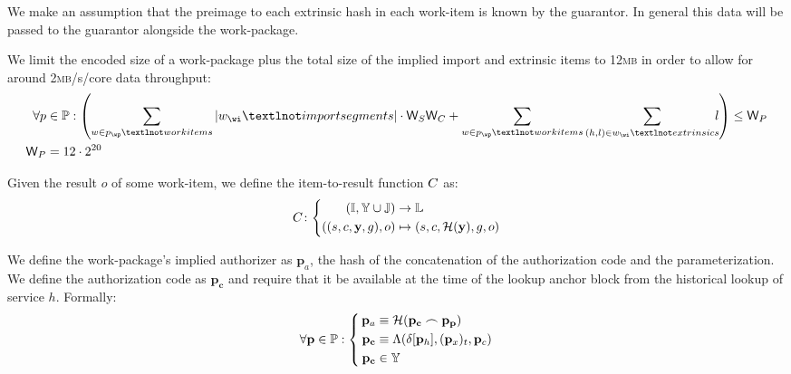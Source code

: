 We make an assumption that the preimage to each extrinsic hash in each work-item is known by the guarantor. In general this data will be passed to the guarantor alongside the work-package.

We limit the encoded size of a work-package plus the total size of the implied import and extrinsic items to 12\textsc{mb} in order to allow for around 2\textsc{mb}/s/core data throughput:
\begin{align}
  \label{eq:checkextractsize}
  \forall p &\in \mathbb{P}: \left(
  \sum_{w \in p_\wp¬workitems} |w_\wi¬importsegments|\cdot\mathsf{W}_S\mathsf{W}_C + \sum_{w \in p_\wp¬workitems} \sum_{(h, l) \in w_\wi¬extrinsics} \!\!\!l\right) \le \mathsf{W}_P \\
  \mathsf{W}_P &= 12\cdot2^{20}
\end{align}


Given the result $o$ of some work-item, we define the item-to-result function $C$ as:
\begin{equation}
  \itemtoresult\colon\left\{\begin{aligned}
    (\mathbb{I}, \Y \cup \mathbb{J}) &\to \mathbb{L}\\
    ((s, c, \mathbf{y}, g), o) &\mapsto (s, c, \mathcal{H}(\mathbf{y}), g, o)
  \end{aligned}\right.
\end{equation}

We define the work-package's implied authorizer as $\mathbf{p}_a$, the hash of the concatenation of the authorization code and the parameterization. We define the authorization code as $\mathbf{p}_\mathbf{c}$ and require that it be available at the time of the lookup anchor block from the historical lookup of service $h$. Formally:
\begin{equation}
  \forall \mathbf{p} \in \mathbb{P}: \left\{\,\begin{aligned}
    \mathbf{p}_a &\equiv \mathcal{H}(\mathbf{p}_\mathbf{c} \concat \mathbf{p}_\mathbf{p}) \\
    \mathbf{p}_\mathbf{c} &\equiv \Lambda(\delta[\mathbf{p}_h], (\mathbf{p}_x)_t, \mathbf{p}_c) \\
    \mathbf{p}_\mathbf{c} &\in \Y
  \end{aligned}\right.
\end{equation}


